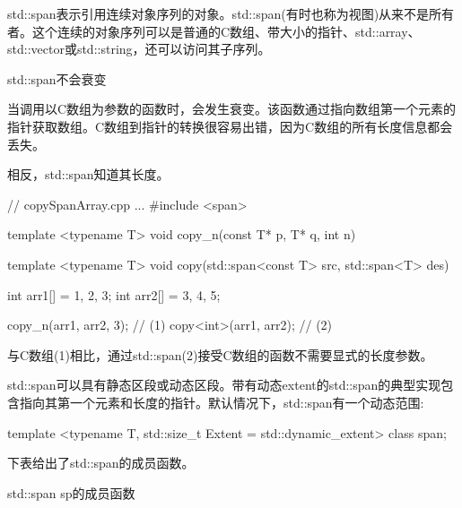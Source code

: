 std::span表示引用连续对象序列的对象。std::span(有时也称为视图)从来不是所有者。这个连续的对象序列可以是普通的C数组、带大小的指针、std::array、std::vector或std::string，还可以访问其子序列。

\begin{myTip}{std::span不会衰变}
	
当调用以C数组为参数的函数时，会发生衰变。该函数通过指向数组第一个元素的指针获取数组。C数组到指针的转换很容易出错，因为C数组的所有长度信息都会丢失。

相反，std::span知道其长度。

\begin{cpp}
// copySpanArray.cpp
...
#include <span>

template <typename T>
void copy_n(const T* p, T* q, int n){}

template <typename T>
void copy(std::span<const T> src, std::span<T> des){}

int arr1[] = {1, 2, 3};
int arr2[] = {3, 4, 5};

copy_n(arr1, arr2, 3); // (1)
copy<int>(arr1, arr2); // (2)
\end{cpp}

与C数组(1)相比，通过std::span(2)接受C数组的函数不需要显式的长度参数。
\end{myTip}

std::span可以具有静态区段或动态区段。带有动态extent的std::span的典型实现包含指向其第一个元素和长度的指针。默认情况下，std::span有一个动态范围:


\begin{cpp}
template <typename T, std::size_t Extent = std::dynamic_extent>
class span;
\end{cpp}

下表给出了std::span的成员函数。

\begin{center}
std::span sp的成员函数
\end{center}

